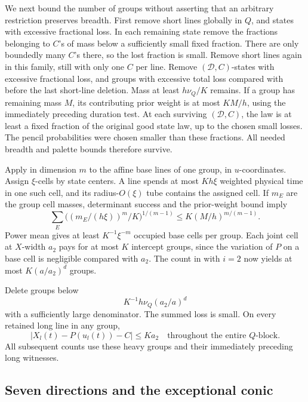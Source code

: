 We next bound the number of groups without asserting that an
arbitrary restriction preserves breadth. First remove short
lines globally in \(Q\), and states with excessive fractional
loss. In each remaining state remove the fractions belonging
to \(C\)'s of mass below a sufficiently small fixed fraction.
There are only boundedly many \(C\)'s there, so the lost fraction
is small. Remove short lines again in this family, still with
only one \(C\) per line. Remove \((\mathcal D,C)\)-states with
excessive fractional loss, and groups with excessive total
loss compared with before the last short-line deletion.
Mass at least \(h\nu_Q/K\) remains.
If a group has remaining mass \(M\), its contributing prior
weight is at most \(KM/h\), using the immediately preceding
duration test.
At each surviving \((\mathcal D,C)\), the law is at least a
fixed fraction of the original good state law, up to the chosen
small losses. The pencil probabilities were chosen smaller
than these fractions. All needed breadth and palette bounds
therefore survive.

Apply  in dimension \(m\) to the
affine base lines of one group, in \(u\)-coordinates.
Assign \(\xi\)-cells by state centers. A line spends at most
\(Kh\xi\) weighted physical time in one such cell, and its
radius-\(O(\xi)\) tube contains the assigned cell.
If \(m_E\) are the group cell masses, determinant success and
the prior-weight bound imply
\[
 \sum_E\big((m_E/(h\xi))^m/K\big)^{1/(m-1)}
       \leq K(M/h)^{m/(m-1)}.
\]
Power mean gives at least \(K^{-1}\xi^{-m}\) occupied base cells
per group. Each joint cell at \(X\)-width \(a_2\) pays for at
most \(K\) intercept groups, since the variation of \(P\) on
a base cell is negligible compared with \(a_2\).
The count in  with \(i=2\) now yields
at most \(K(a/a_2)^d\) groups.

Delete groups below
\begin{equation}\label{a05:heavy-group}
 K^{-1}h\nu_Q(a_2/a)^d
\end{equation}
with a sufficiently large denominator. The summed loss is small.
On every retained long line in any group,
\begin{equation}\label{a05:potential-fit}
 |X_l(t)-P(u_l(t))-C|\leq Ka_2
 \quad\text{throughout the entire }Q\text{-block}.
\end{equation}
All subsequent counts use these heavy groups and their immediately
preceding long witnesses.


\subsection{Seven directions and the exceptional conic}

